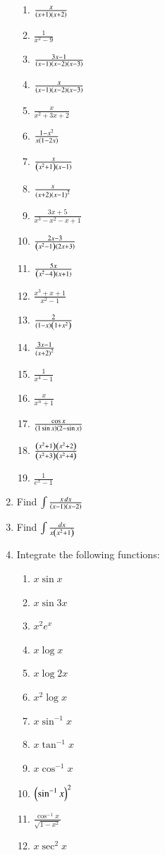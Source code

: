 \begin{enumerate}[label=\arabic*.,ref=\thesubsection.\theenumi]
\begin{enumerate}[label = (\roman*)]
\item $\frac{x}{\left(x+1\right)\left(x+2\right)}$
\item $\frac{1}{x^2-9}$
\item $\frac{3x-1}{\left(x-1\right)\left(x-2\right)\left(x-3\right)}$
\item $\frac{x}{\left(x-1\right)\left(x-2\right)\left(x-3\right)}$
\item $\frac{x}{x^2+3x+2}$
\item $\frac{1-x^2}{x\left(1-2x\right)}$
\item $\frac{x}{\left(x^2+1\right)\left(x-1\right)}$
\item $\frac{x}{\left(x+2\right)\left(x-1\right)^2}$
\item $\frac{3x+5}{x^3-x^2-x+1}$
\item $\frac{2x-3}{\left(x^2-1\right)\left(2x+3\right)}$
\item $\frac{5x}{\left(x^2-4\right)\left(x+1\right)}$
\item $\frac{x^3+x+1}{x^2-1}$
\item $\frac{2}{\left(1-x\right)\left(1+x^2\right)}$
\item $\frac{3x-1}{\left(x+2\right)^2}$
\item $\frac{1}{x^4-1}$
\item $\frac{x}{x^n+1}$
\item $\frac{\cos x}{\left(1\sin x\right)\left(2-\sin x\right)}$
\item $\frac{\left(x^2+1\right)\left(x^2+2\right)}{\left(x^2+3\right)\left(x^2+4\right)}$
\item $\frac{1}{e^x-1}$
\end{enumerate}
%
\item Find $\int \frac{x\, dx}{\left(x-1\right)\left(x-2\right)}$
\item Find $\int \frac{ dx}{x\left(x^2+1\right)}$
%
\item Integrate the following functions:
\begin{enumerate}[label = (\roman*)]
\item $x\sin x$
\item $x\sin 3x$
\item $x^2e^x$
\item $x\log x$
\item $x\log 2x$
\item $x^2\log x$
\item $x\sin^{-1} x$
\item $x\tan^{-1} x$
\item $x\cos^{-1} x$
\item $\left(\sin^{-1} x\right)^2$
\item $\frac{\cos^{-1} x}{\sqrt{1-x^2}}$
\item $x\sec^2 x$

\end{enumerate}
\end{enumerate}
